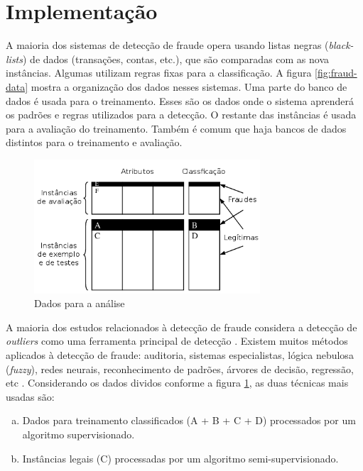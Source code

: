 \section{Implementação}

A maioria dos sistemas de detecção de fraude opera usando listas negras (\emph{black-lists}) de dados (transações, contas, etc.), que são comparadas com as nova instâncias. Algumas utilizam regras fixas para a classificação. A figura \ref{fig:fraud-data} mostra a organização dos dados nesses sistemas. Uma parte do banco de dados é usada para o treinamento. Esses são os dados onde o sistema aprenderá os padrões e regras utilizados para a detecção. O restante das instâncias é usada para a avaliação do treinamento. Também é comum que haja bancos de dados distintos para o treinamento e avaliação.

\begin{figure}[h!]
\centering
\includegraphics[width=0.75\textwidth]{img/fraud-data.png}
\caption{Dados para a análise}
\label{fig:fraud_data}
\end{figure}

A maioria dos estudos relacionados à detecção de fraude considera a detecção de \emph{outliers} como uma ferramenta principal de detecção \cite{Aral2011}. Existem muitos métodos aplicados à detecção de fraude: auditoria, sistemas especialistas, lógica nebulosa (\emph{fuzzy}), redes neurais, reconhecimento de padrões, árvores de decisão, regressão, etc \cite{Huang2010}. Considerando os dados dividos conforme a figura \ref{fig:fraud_data}, as duas técnicas mais usadas são:

\begin{enumerate}[a)]
\item Dados para treinamento classificados (A + B + C + D) processados por um algoritmo supervisionado.
\item Instâncias legais (C) processadas por um algoritmo semi-supervisionado.
\end{enumerate}

